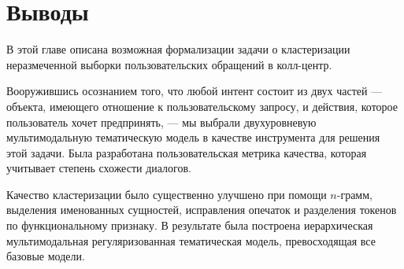 \section{Выводы}

В этой главе описана возможная формализации задачи о кластеризации неразмеченной выборки пользовательских обращений в колл-центр.

Вооружившись осознанием того, что любой интент состоит из двух частей --- объекта, имеющего отношение к пользовательскому запросу, и действия, которое пользователь хочет предпринять, --- мы выбрали двухуровневую мультимодальную тематическую модель в качестве инструмента для решения этой задачи. Была разработана пользовательская метрика качества, которая учитывает степень схожести диалогов.

Качество кластеризации было существенно улучшено при помощи $n$-грамм, выделения именованных сущностей, исправления опечаток и разделения токенов по функциональному признаку. В результате была построена иерархическая мультимодальная регуляризованная тематическая модель, превосходящая все базовые модели.

